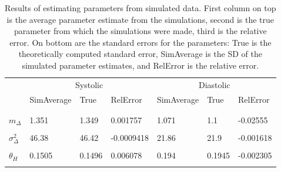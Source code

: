 \documentclass[
]{article}
\begin{document}
\begin{table}[!h]

\caption{\label{tab:testparameters}Results of estimating parameters from simulated data. 
    First column on top is the average parameter estimate from the simulations, second is the true parameter from which the simulations were made, third is the relative error.
    On bottom are the standard errors for the parameters: True is the theoretically computed standard error, SimAverage is the SD of the simulated parameter estimates, and RelError is the relative error.}
\centering
\begin{tabular}[t]{lllllll}
\toprule
\multicolumn{1}{c}{ } & \multicolumn{3}{c}{Systolic} & \multicolumn{3}{c}{Diastolic} \\
\cmidrule(l{3pt}r{3pt}){2-4} \cmidrule(l{3pt}r{3pt}){5-7}
  & SimAverage & True & RelError & SimAverage & True & RelError\\
\midrule
\addlinespace[0.3em]
\multicolumn{7}{l}{\textbf{Parameter estimates}}\\
\cellcolor{gray!6}{\hspace{1em}$m_M$} & \cellcolor{gray!6}{123.3} & \cellcolor{gray!6}{123.3} & \cellcolor{gray!6}{-0.000751} & \cellcolor{gray!6}{72.32} & \cellcolor{gray!6}{72.31} & \cellcolor{gray!6}{0.0001158}\\
\hspace{1em}$m_\Delta$ & 1.351 & 1.349 & 0.001757 & 1.071 & 1.1 & -0.02555\\
\cellcolor{gray!6}{\hspace{1em}$\sigma^2_M$} & \cellcolor{gray!6}{375.3} & \cellcolor{gray!6}{376.8} & \cellcolor{gray!6}{-0.003896} & \cellcolor{gray!6}{104.4} & \cellcolor{gray!6}{104} & \cellcolor{gray!6}{0.00422}\\
\hspace{1em}$\sigma^2_\Delta$ & 46.38 & 46.42 & -0.0009418 & 21.86 & 21.9 & -0.001618\\
\cellcolor{gray!6}{\hspace{1em}$\alpha_H$} & \cellcolor{gray!6}{2.164} & \cellcolor{gray!6}{2.158} & \cellcolor{gray!6}{0.00286} & \cellcolor{gray!6}{2.352} & \cellcolor{gray!6}{2.322} & \cellcolor{gray!6}{0.0129}\\
\hspace{1em}$\theta_H$ & 0.1505 & 0.1496 & 0.006078 & 0.194 & 0.1945 & -0.002305\\
\cellcolor{gray!6}{\hspace{1em}$\alpha_C$} & \cellcolor{gray!6}{2.595} & \cellcolor{gray!6}{2.569} & \cellcolor{gray!6}{0.0101} & \cellcolor{gray!6}{2.725} & \cellcolor{gray!6}{2.756} & \cellcolor{gray!6}{-0.01128}\\

\end{tabular}
\end{table}
\end{document}
